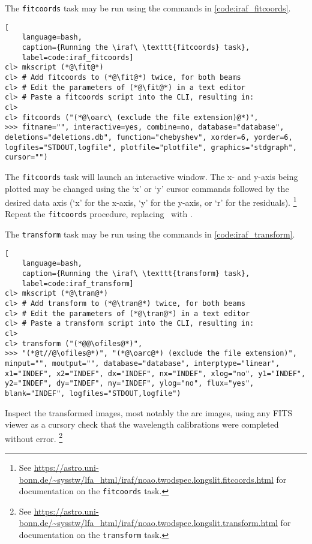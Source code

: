 The \texttt{fitcoords} task may be run using the commands in \autoref{code:iraf_fitcoords}.

\begin{lstlisting}[
    language=bash,
    caption={Running the \iraf\ \texttt{fitcoords} task},
    label=code:iraf_fitcoords]
cl> mkscript (*@\fit@*)
cl> # Add fitcoords to (*@\fit@*) twice, for both beams
cl> # Edit the parameters of (*@\fit@*) in a text editor
cl> # Paste a fitcoords script into the CLI, resulting in:
cl> 
cl> fitcoords ("(*@\oarc\ (exclude the file extension)@*)",
>>> fitname="", interactive=yes, combine=no, database="database", deletions="deletions.db", function="chebyshev", xorder=6, yorder=6, logfiles="STDOUT,logfile", plotfile="plotfile", graphics="stdgraph", cursor="")
\end{lstlisting}
{\parskip=0pt The} \texttt{fitcoords} task will launch an interactive window. The x- and y-axis being plotted may be changed using the `x' or `y' cursor commands followed by the desired data axis (`x' for the x-axis, `y' for the y-axis, or `r' for the residuals).%
\footnote{See \protect\url{https://astro.uni-bonn.de/~sysstw/lfa_html/iraf/noao.twodspec.longslit.fitcoords.html} for documentation on the \texttt{fitcoords} task.}
Repeat the \texttt{fitcoords} procedure, replacing \oarc\ with \earc.

The \texttt{transform} task may be run using the commands in \autoref{code:iraf_transform}.

\begin{lstlisting}[
    language=bash,
    caption={Running the \iraf\ \texttt{transform} task},
    label=code:iraf_transform]
cl> mkscript (*@\tran@*)
cl> # Add transform to (*@\tran@*) twice, for both beams
cl> # Edit the parameters of (*@\tran@*) in a text editor
cl> # Paste a transform script into the CLI, resulting in:
cl> 
cl> transform ("(*@@\ofiles@*)",
>>> "(*@t//@\ofiles@*)", "(*@\oarc@*) (exclude the file extension)", minput="", moutput="", database="database", interptype="linear", x1="INDEF", x2="INDEF", dx="INDEF", nx="INDEF", xlog="no", y1="INDEF", y2="INDEF", dy="INDEF", ny="INDEF", ylog="no", flux="yes", blank="INDEF", logfiles="STDOUT,logfile")
\end{lstlisting}

Inspect the transformed images, most notably the arc images, using any \gls{FITS} viewer as a cursory check that the wavelength calibrations were completed without error.%
\footnote{See \protect\url{https://astro.uni-bonn.de/~sysstw/lfa_html/iraf/noao.twodspec.longslit.transform.html} for documentation on the \texttt{transform} task.}

